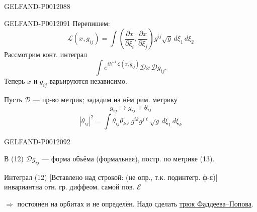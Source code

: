 \begin{GelfandAdjacentEvidence}{GELFAND-P001208}{8}

\end{GelfandAdjacentEvidence}



\begin{GelfandAdjacentEvidence}{GELFAND-P001209}{1}
Перепишем:
\begin{equation*}
\mathcal L(x,g_{ij})=
\int\left(\frac{\partial x}{\partial\xi_i},\frac{\partial x}{\partial\xi_j}\right)
g^{ij}\sqrt g\,d\xi_1\,d\xi_2 \tag{9'}
\end{equation*}
Рассмотрим конт. интеграл
\begin{equation*}
\int e^{ih^{-1}\mathcal L(x,g_{ij})}\mathcal D x\,\mathcal D g_{ij}. \tag{12}
\end{equation*}
Теперь \(x\) и \(g_{ij}\) варьируются независимо.

Пусть \(\mathcal D\) --- пр-во метрик; зададим на нём рим. метрику
\[
g_{ij}\longmapsto g_{ij}+\theta_{ij}
\]
\begin{equation*}
|\theta_{ij}|^2=\int\theta_{ij}\theta_{k\ell}g^{ik}g^{j\ell}\sqrt g\,d\xi_1\,d\xi_k
\tag{13}
\end{equation*}
\end{GelfandAdjacentEvidence}
\begin{GelfandAdjacentEvidence}{GELFAND-P001209}{2}


В (12) \(\mathcal D g_{ij}\) --- форма объёма (формальная), постр. по метрике (13).

Интеграл (12) [Вставлено над строкой: (не опр., т.к. подинтегр. ф-я)] инвариантна отн. гр. диффеом. самой пов. \(\mathcal E\)
\end{GelfandAdjacentEvidence}


\(\Rightarrow\) постоянен на орбитах и не определён. Надо сделать \underline{трюк Фаддеева--Попова}.


